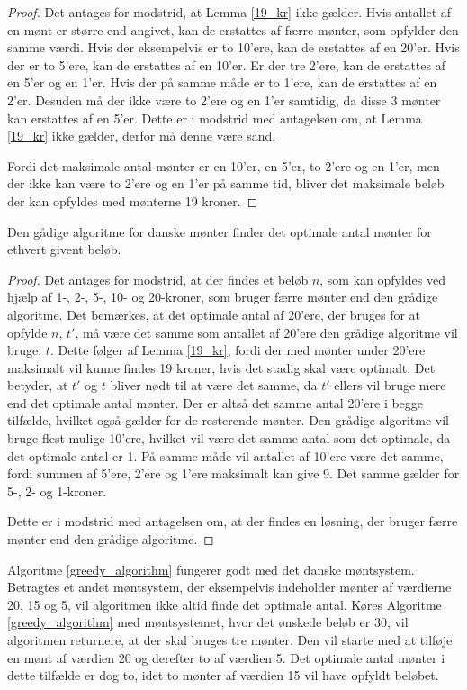 \begin{proof}
\label{19_kr_bevis}
Det antages for modstrid, at Lemma \ref{19_kr} ikke gælder.
Hvis antallet af en mønt er større end angivet, kan de erstattes af færre mønter, som opfylder den samme værdi. 
Hvis der eksempelvis er to 10'ere, kan de erstattes af en 20'er. 
Hvis der er to 5'ere, kan de erstattes af en 10'er. 
Er der tre 2'ere, kan de erstattes af en 5'er og en 1'er. 
Hvis der på samme måde er to 1'ere, kan de erstattes af en 2'er.
Desuden må der ikke være to 2'ere og en 1'er samtidig, da disse 3 mønter kan erstattes af en 5'er. 
Dette er i modstrid med antagelsen om, at Lemma \ref{19_kr} ikke gælder, derfor må denne være sand. 

Fordi det maksimale antal mønter er en 10'er, en 5'er, to 2'ere og en 1'er, men der ikke kan være to 2'ere og en 1'er på samme tid, bliver det maksimale beløb der kan opfyldes med mønterne 19 kroner. 
\end{proof}

\begin{thm}
\label{gradig_satning}
Den gådige algoritme for danske mønter finder det optimale antal mønter for ethvert givent beløb.
\end{thm}

\begin{proof}
\label{gradig_bevis}
Det antages for modstrid, at der findes et beløb $n$, som kan opfyldes ved hjælp af 1-, 2-, 5-, 10- og 20-kroner, som bruger færre mønter end den grådige algoritme. 
Det bemærkes, at det optimale antal af 20'ere, der bruges for at opfylde $n$, $t'$, må være det samme som antallet af 20'ere den grådige algoritme vil bruge, $t$. 
Dette følger af Lemma \ref{19_kr}, fordi der med mønter under 20'ere maksimalt vil kunne findes 19 kroner, hvis det stadig skal være optimalt. 
Det betyder, at $t'$ og $t$ bliver nødt til at være det samme, da $t'$ ellers vil bruge mere end det optimale antal mønter. 
Der er altså det samme antal 20'ere i begge tilfælde, hvilket også gælder for de resterende mønter. 
Den grådige algoritme vil bruge flest mulige 10'ere, hvilket vil være det samme antal som det optimale, da det optimale antal er 1. 
På samme måde vil antallet af 10'ere være det samme, fordi summen af 5'ere, 2'ere og 1'ere maksimalt kan give 9.
Det samme gælder for 5-, 2- og 1-kroner.

Dette er i modstrid med antagelsen om, at der findes en løsning, der bruger færre mønter end den grådige algoritme.
\end{proof}

Algoritme \ref{greedy_algorithm} fungerer godt med det danske møntsystem. 
Betragtes et andet møntsystem, der eksempelvis indeholder mønter af værdierne 20, 15 og 5, vil algoritmen ikke altid finde det optimale antal. 
Køres Algoritme \ref{greedy_algorithm} med møntsystemet, hvor det ønskede beløb er 30, vil algoritmen returnere, at der skal bruges tre mønter. 
Den vil starte med at tilføje en mønt af værdien 20 og derefter to af værdien 5.
Det optimale antal mønter i dette tilfælde er dog to, idet to mønter af værdien 15 vil have opfyldt beløbet.
